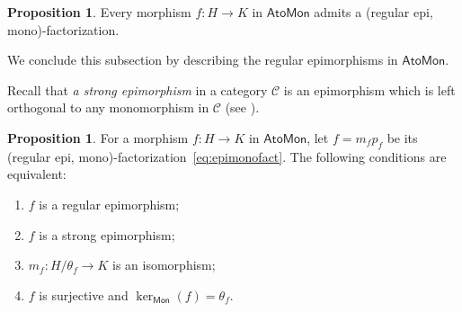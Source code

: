 \documentclass[a4paper,10pt,reqno]{amsart}
\theoremstyle{definition}
\newtheorem{proposition}[theorem]{Proposition}
\theoremstyle{remark}
\newcommand{\AtoMon}{\mathsf{AtoMon}}
\newcommand{\Mon}{\mathsf{Mon}}
\newcommand{\Cal}[1]{\mathcal{#1}}
\begin{document}
\begin{proposition}\label{prop:image-factorization}
Every morphism $f:H\to K$ in $\AtoMon$ admits a (regular epi, mono)-factorization.
\end{proposition}

We conclude this subsection by describing the regular epimorphisms in $\AtoMon$.

Recall that {\em a strong epimorphism} in a category $\Cal C$ is an epimorphism which is left orthogonal to any monomorphism in $\Cal C$ (see \cite{Gran}).

\begin{proposition}\label{prop:strong-regular-epi}
For a morphism $f:H\to K$ in $\AtoMon$, let $f=m_fp_f$ be its (regular epi, mono)-facto\-ri\-za\-tion~\eqref{eq:epimonofact}. The following conditions are
equivalent:
\begin{enumerate}[label=\textup{(\arabic*)}]
\item\label{prop:strong-regular-epi 1} $f$ is a regular epimorphism;
\item\label{prop:strong-regular-epi 2} $f$ is a strong epimorphism;
\item\label{prop:strong-regular-epi 3} $m_f:H/\theta_f\to K$ is an isomorphism;
\item\label{prop:strong-regular-epi 4} $f$ is surjective and $\ker_{\Mon}(f)=\theta_f$.
\end{enumerate}
\end{proposition}
\end{document}
